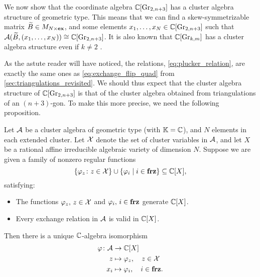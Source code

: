 \medskip

We now show that the coordinate algebra $\mathbb{C}[\operatorname{Gr}_{2,n+3}]$ has a cluster algebra
structure of geometric type. This means that we can find a skew-symmetrizable matrix
$\widetilde{B} \in M_{N \times \mathbf{ex}}$, and some elements $x_1, \dots, x_N \in \mathbb{C}[\operatorname{Gr}_{2, n+3}]$
such that $\mathcal{A}(\widetilde{B}, (x_1, \dots, x_N)) \cong \mathbb{C}[\operatorname{Gr}_{2, n+3}]$. It is also known
that $\mathbb{C}[\operatorname{Gr}_{k,m}]$ has a cluster algebra structure even if $k \neq 2$
\parencite{Scott2006GrassmanniansCA}.

As the astute reader will have noticed, the relations, \cref{eq:plucker_relation}, are
exactly the same ones as \cref{eq:exchange_flip_quad} from
\cref{sec:triangulations_revisited}. We should thus expect that the cluster algebra
structure of $\mathbb{C}[\operatorname{Gr}_{2,n+3}]$ is that of the cluster algebra obtained from
triangulations of an $(n+3)$-gon. To make this more precise, we need the following
proposition.
\begin{proposition}\label{prop:cluster_structure}

	Let $\mathcal{A}$ be a cluster algebra of geometric type (with $\mathbb{K} = \mathbb{C}$), and $N$
	elements in each extended cluster. Let $\mathcal{X}$ denote the set of cluster variables in
	$\mathcal{A}$, and let $X$ be a rational affine irreducible algebraic variety of dimension
	$N$. Suppose we are given a family of nonzero regular functions
	\begin{equation*}
		\{\varphi_z \colon z \in \mathcal{X} \} \cup \{\varphi_i \mid i \in \mathbf{frz}\} \subseteq \mathbb{C}[X],
	\end{equation*}
	satisfying:
	\begin{itemize}
		\item The functions $\varphi_z,\, z\in \mathcal{X}$ and $\varphi_i,\, i \in \mathbf{frz}$ generate
		      $\mathbb{C}[X]$.
		\item Every exchange relation in $\mathcal{A}$ is valid in $\mathbb{C}[X]$.
	\end{itemize}
	Then there is a unique $\mathbb{C}$-algebra isomorphism
	\begin{align*}
		\varphi \colon \mathcal{A} & \to \mathbb{C}[X]                         \\
		z                   & \mapsto \varphi_z,\quad z \in \mathcal{X}  \\
		x_i                 & \mapsto \varphi_i,\quad i \in \mathbf{frz}.
	\end{align*}
\end{proposition}

